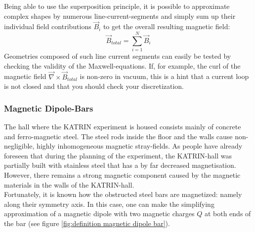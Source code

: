     Being able to use the superposition principle, it is possible to approximate complex shapes by numerous line-current-segments and simply sum up their individual field contributions $\vec{B}_{i}$ to get the overall resulting magnetic field:
    \begin{equation}
      \vec{B}_{total}=\sum_{i=1}^{N} \vec{B}_i
    \end{equation}
    Geometries composed of such line current segments can easily be tested by checking the validity of the Maxwell-equations. If, for example, the curl of the magnetic field $\vec{\nabla}\times\vec{B}_{total}$ is non-zero in vacuum, this is a hint that a current loop is not closed and that you should check your discretization.

    \subsubsection{Magnetic Dipole-Bars}
      The hall where the KATRIN experiment is housed consists mainly of concrete and ferro-magnetic steel. The steel rods inside the floor and the walls cause non-negligible, highly inhomogeneous magnetic stray-fields. As people have already foreseen that during the planning of the experiment, the KATRIN-hall was partially built with stainless steel that has a by far decreased magnetisation. However, there remains a strong magnetic component caused by the magnetic materials in the walls of the KATRIN-hall. \\
      Fortunately, it is known how the obstructed steel bars are magnetized: namely along their symmetry axis. In this case, one can make the simplifying approximation of a magnetic dipole with two magnetic charges $Q$ at both ends of the bar (see figure \ref{fig:definition magnetic dipole bar}).
